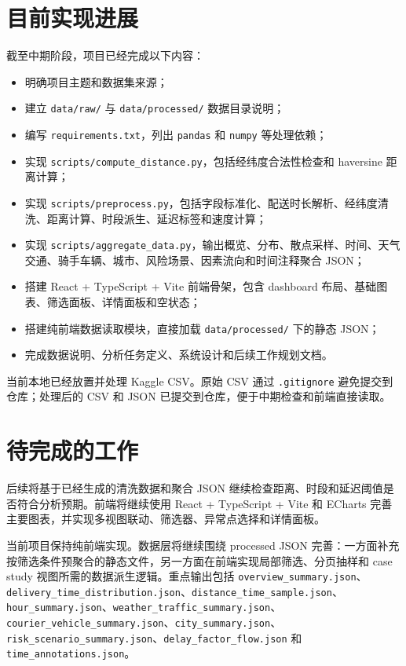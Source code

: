 \documentclass[UTF8, a4paper, 12pt, fontset=fandol]{ctexart}
\begin{document}
\section{目前实现进展}

截至中期阶段，项目已经完成以下内容：

\begin{itemize}[leftmargin=2em]
  \item 明确项目主题和数据集来源；
  \item 建立 \texttt{data/raw/} 与 \texttt{data/processed/} 数据目录说明；
  \item 编写 \texttt{requirements.txt}，列出 \texttt{pandas} 和 \texttt{numpy} 等处理依赖；
  \item 实现 \texttt{scripts/compute\_distance.py}，包括经纬度合法性检查和 haversine 距离计算；
  \item 实现 \texttt{scripts/preprocess.py}，包括字段标准化、配送时长解析、经纬度清洗、距离计算、时段派生、延迟标签和速度计算；
  \item 实现 \texttt{scripts/aggregate\_data.py}，输出概览、分布、散点采样、时间、天气交通、骑手车辆、城市、风险场景、因素流向和时间注释聚合 JSON；
  \item 搭建 React + TypeScript + Vite 前端骨架，包含 dashboard 布局、基础图表、筛选面板、详情面板和空状态；
  \item 搭建纯前端数据读取模块，直接加载 \texttt{data/processed/} 下的静态 JSON；
  \item 完成数据说明、分析任务定义、系统设计和后续工作规划文档。
\end{itemize}

当前本地已经放置并处理 Kaggle CSV。原始 CSV 通过 \texttt{.gitignore} 避免提交到仓库；处理后的 CSV 和 JSON 已提交到仓库，便于中期检查和前端直接读取。

\section{待完成的工作}

后续将基于已经生成的清洗数据和聚合 JSON 继续检查距离、时段和延迟阈值是否符合分析预期。前端将继续使用 React + TypeScript + Vite 和 ECharts 完善主要图表，并实现多视图联动、筛选器、异常点选择和详情面板。

当前项目保持纯前端实现。数据层将继续围绕 processed JSON 完善：一方面补充按筛选条件预聚合的静态文件，另一方面在前端实现局部筛选、分页抽样和 case study 视图所需的数据派生逻辑。重点输出包括 \texttt{overview\_summary.json}、\texttt{delivery\_time\_distribution.json}、\texttt{distance\_time\_sample.json}、\texttt{hour\_summary.json}、\texttt{weather\_traffic\_summary.json}、\texttt{courier\_vehicle\_summary.json}、\texttt{city\_summary.json}、\texttt{risk\_scenario\_summary.json}、\texttt{delay\_factor\_flow.json} 和 \texttt{time\_annotations.json}。
\end{document}
